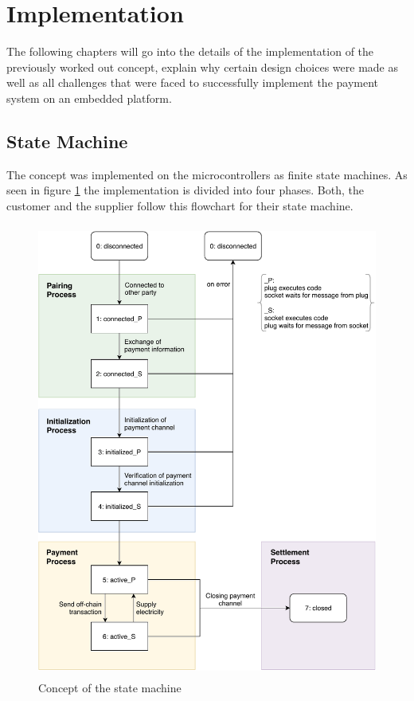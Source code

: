 \section{Implementation}
The following chapters will go into the details of the implementation of the previously worked out concept, explain why certain design choices were made as well as all challenges that were faced to successfully implement the payment system on an embedded platform.
\\
\subsection{State Machine}
The concept was implemented on the microcontrollers as finite state machines.
As seen in figure \ref{fig:state_machine} the implementation is divided into four phases.
Both, the customer and the supplier follow this flowchart for their state machine.
\\
\begin{figure}[H]
  \begin{center}
    \includegraphics[height=15cm]{img/state_machine.pdf}
    \caption{Concept of the state machine}
    \label{fig:state_machine}
  \end{center}
\end{figure}
